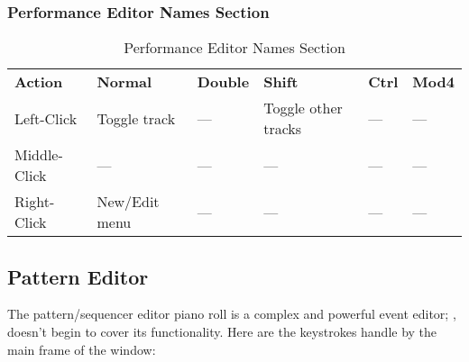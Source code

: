 \subsubsection{Performance Editor Names Section}
\label{subsubsec:kbd_mouse_performance_editor_names_section}

   \begin{table}[H]
      \centering
      \caption{Performance Editor Names Section}
      \label{table:performance_editor_names}
      \begin{tabular}{l l l l l l}
         \textbf{Action}   & \textbf{Normal}    & \textbf{Double}    & \textbf{Shift}        & \textbf{Ctrl}   & \textbf{Mod4}      \\
         Left-Click        & Toggle track       & ---                & Toggle other tracks   & ---             & ---                \\
         Middle-Click      & ---                & ---                & ---                   & ---             & ---                \\
         Right-Click       & New/Edit menu      & ---                & ---                   & ---             & ---                \\
      \end{tabular}
   \end{table}

\subsection{Pattern Editor}
\label{subsec:kbd_mouse_pattern_editor}

   The pattern/sequencer editor piano roll is a complex and powerful event
   editor;
   ,
   doesn't begin to cover its functionality.
   Here are the keystrokes handle by the main frame of the window:

